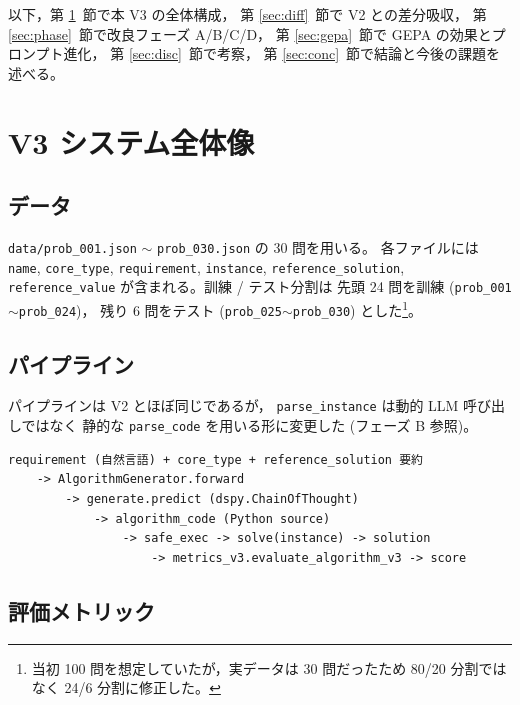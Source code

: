 \documentclass[uplatex,dvipdfmx,a4paper,11pt]{jsarticle}
\begin{document}
以下，第 \ref{sec:sys}~節で本 V3 の全体構成，
第 \ref{sec:diff}~節で V2 との差分吸収，
第 \ref{sec:phase}~節で改良フェーズ A/B/C/D，
第 \ref{sec:gepa}~節で GEPA の効果とプロンプト進化，
第 \ref{sec:disc}~節で考察，
第 \ref{sec:conc}~節で結論と今後の課題を述べる。

\section{V3 システム全体像}\label{sec:sys}

\subsection{データ}

\texttt{data/prob\_001.json} $\sim$ \texttt{prob\_030.json} の 30 問を用いる。
各ファイルには
\texttt{name}, \texttt{core\_type}, \texttt{requirement},
\texttt{instance}, \texttt{reference\_solution}, \texttt{reference\_value}
が含まれる。訓練 / テスト分割は
先頭 24 問を訓練 (\texttt{prob\_001}$\sim$\texttt{prob\_024})，
残り 6 問をテスト (\texttt{prob\_025}$\sim$\texttt{prob\_030}) とした\footnote{%
当初 100 問を想定していたが，実データは 30 問だったため
80/20 分割ではなく 24/6 分割に修正した。}。

\subsection{パイプライン}

パイプラインは V2 とほぼ同じであるが，
\texttt{parse\_instance} は動的 LLM 呼び出しではなく
静的な \texttt{parse\_code} を用いる形に変更した (フェーズ B 参照)。

\begin{lstlisting}[language={}]
requirement (自然言語) + core_type + reference_solution 要約
    -> AlgorithmGenerator.forward
        -> generate.predict (dspy.ChainOfThought)
            -> algorithm_code (Python source)
                -> safe_exec -> solve(instance) -> solution
                    -> metrics_v3.evaluate_algorithm_v3 -> score
\end{lstlisting}

\subsection{評価メトリック}
\end{document}
